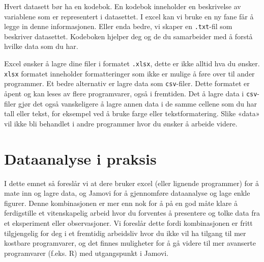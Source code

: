 \documentclass[
  letterpaper,
  DIV=11,
  numbers=noendperiod,
  oneside]{scrreprt}
\begin{document}
Hvert datasett bør ha en kodebok. En kodebok inneholder en beskrivelse
av variablene som er representert i datasettet. I excel kan vi bruke en
ny fane får å legge in denne informasjonen. Eller enda bedre, vi skaper
en \texttt{.txt}-fil som beskriver datasettet. Kodeboken hjelper deg og
de du samarbeider med å forstå hvilke data som du har.

Excel ønsker å lagre dine filer i formatet \texttt{.xlsx}, dette er ikke
alltid hva du ønsker. \texttt{xlsx} formatet inneholder formatteringer
som ikke er mulige å føre over til ander programmer. Et bedre alternativ
er lagre data som \texttt{csv}-filer. Dette formatet er åpent og kan
leses av flere programvarer, også i fremtiden. Det å lagre data i
\texttt{csv}-filer gjør det også vanskeligere å lagre annen data i de
samme cellene som du har tall eller tekst, for eksempel ved å bruke
farge eller tekstformatering. Slike «data» vil ikke bli behandlet i
andre programmer hvor du ønsker å arbeide videre.


\hypertarget{dataanalyse-i-praksis}{%
\section{Dataanalyse i praksis}\label{dataanalyse-i-praksis}}

I dette emnet så foreslår vi at dere bruker excel (eller lignende
programmer) for å mate inn og lagre data, og Jamovi for å gjennomføre
dataanalyse og lage enkle figurer. Denne kombinasjonen er mer enn nok
for å på en god måte klare å ferdigstille et vitenskapelig arbeid hvor
du forventes å presentere og tolke data fra et eksperiment eller
observasjoner. Vi foreslår dette fordi kombinasjonen er fritt
tilgjengelig for deg i et fremtidig arbeidsliv hvor du ikke vil ha
tilgang til mer kostbare programvarer, og det finnes muligheter for å gå
videre til mer avanserte programvarer (f.eks. R) med utgangspunkt i
Jamovi.
\end{document}
